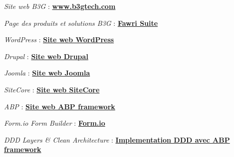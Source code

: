 \documentclass[12pt,a4paper,oneside]{book}
\begin{document}








%




\appendix



% 

\begin{thebibliography}{99}


    \emph{Site web B3G} :
    \href{https://b3gtech.com/}{\textbf{www.b3gtech.com}}

    \emph{Page des produits et solutions B3G} :
    \href{https://b3gtech.com/fawri-suite/}{\textbf{Fawri Suite}}


    \emph{WordPress} :
    \href{https://wordpress.com/fr/}{\textbf{Site web WordPress}}

    \emph{Drupal} :
    \href{https://www.drupal.org/}{\textbf{Site web Drupal}}

    \emph{Joomla} :
    \href{https://www.joomla.fr/}{\textbf{Site web Joomla}}

    \emph{SiteCore} :
    \href{https://www.sitecore.com/}{\textbf{Site web SiteCore}}

    \emph{ABP} :
    \href{https://abp.io/}{\textbf{Site web ABP framework}}

    \emph{Form.io Form Builder} :
    \href{https://form.io/}{\textbf{Form.io}}

    \emph{DDD Layers \& Clean Architecture} :
    \href{https://docs.abp.io/en/abp/4.2/Domain-Driven-Design-Implementation-Guide}{\textbf{Implementation DDD avec ABP framework}}



\end{thebibliography}
\end{document}
